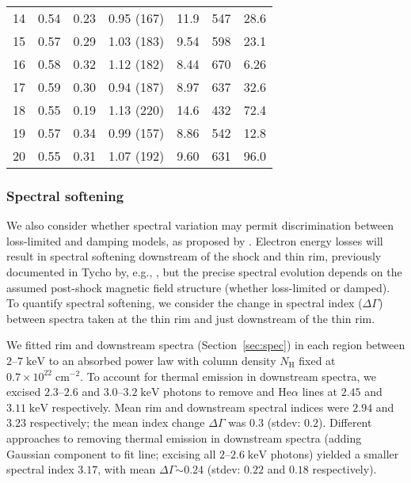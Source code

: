 \documentclass[manuscript]{aastex}  %
\newcommand*{\mt}{\mathrm}
\newcommand*{\unit}[1]{\;\mt{#1}}  %
\newcommand*{\abt}{\mathord{\sim}} %
\begin{document}
\begin{table}
\begin{tabular}{@{}l ccc ccr@{}}
    \cmidrule{1-7}
    14 & 0.54 & 0.23 & 0.95 (167) & 11.9 & 547 & 28.6 \\
    15 & 0.57 & 0.29 & 1.03 (183) & 9.54 & 598 & 23.1 \\
    16 & 0.58 & 0.32 & 1.12 (182) & 8.44 & 670 & 6.26 \\
    17 & 0.59 & 0.30 & 0.94 (187) & 8.97 & 637 & 32.6 \\
    \cmidrule{1-7}
    18 & 0.55 & 0.19 & 1.13 (220) & 14.6 & 432 & 72.4 \\
    19 & 0.57 & 0.34 & 0.99 (157) & 8.86 & 542 & 12.8 \\
    20 & 0.55 & 0.31 & 1.07 (192) & 9.60 & 631 & 96.0 \\
    \bottomrule
    \end{tabular}
\end{table}

\subsubsection{Spectral softening}

We also consider whether spectral variation may permit discrimination between
loss-limited and damping models, as proposed by \citet{rettig2012}.  Electron
energy losses will result in spectral softening downstream of the shock and
thin rim, previously documented in Tycho by, e.g., \citet{cassam-chenai2007},
but the precise spectral evolution depends on the assumed post-shock magnetic
field structure (whether loss-limited or damped).  To quantify spectral
softening, we consider the change in spectral index ($\Delta \Gamma$) between
spectra taken at the thin rim and just downstream of the thin rim.

We fitted rim and downstream spectra (Section~\ref{sec:spec}) in each region
between $2$--$7 \unit{keV}$ to an absorbed power law with column density
$N_{\mt{H}}$ fixed at $0.7 \times 10^{22} \unit{cm^{-2}}$.  To account for
thermal emission in downstream spectra, we excised $2.3$--$2.6$ and
$3.0$--$3.2 \unit{keV}$ photons to remove  and 
He$\alpha$ lines at $2.45$ and $3.11 \unit{keV}$ respectively.  Mean rim and
downstream spectral indices were $2.94$ and $3.23$ respectively; the mean
index change $\Delta \Gamma$ was $0.3$ (stdev: $0.2$).  Different approaches to
removing thermal emission in downstream spectra (adding Gaussian component to
fit  line; excising all $2$--$2.6 \unit{keV}$ photons) yielded a
smaller spectral index $3.17$, with mean $\Delta \Gamma \abt 0.24$ (stdev:
$0.22$ and $0.18$ respectively).
\end{document}
